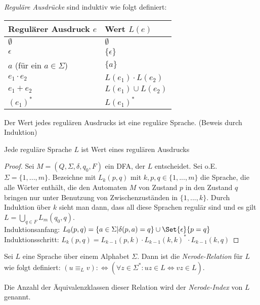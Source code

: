 \documentclass{cheat-sheet}
\begin{document}
\begin{defn}
\emph{Reguläre Ausdrücke} sind induktiv wie folgt definiert:

\begin{center}
\begin{tabular}{ l | l }
  Regulärer Ausdruck $e$ & Wert $L(e)$ \\
  \hline
  $\emptyset$ & $\emptyset$ \\
  $\epsilon$ & $\{\epsilon\}$ \\
  $a$ (für ein $a \in \Sigma$) & $\{ a \}$ \\
  $e_{1} \cdot e_{2}$ & $L(e_{1}) \cdot L(e_{2})$ \\
  $e_{1} + e_{2}$ & $L(e_{1}) \cup L(e_{2})$ \\
  $(e_{1})^{*}$ & $L(e_{1})^{*}$ \\
\end{tabular}
\end{center}

\end{defn}

\begin{satz}
Der Wert jedes regulären Ausdrucks ist eine reguläre Sprache. (Beweis durch Induktion)
\end{satz}

\begin{satz}
Jede reguläre Sprache $L$ ist Wert eines regulären Ausdrucks
\end{satz}

\begin{proof}
Sei $M = (Q, \Sigma, \delta, q_{0}, F)$ ein DFA, der $L$ entscheidet. Sei o.E. $\Sigma = \{ 1, ..., m \}$. Bezeichne mit $L_{k}(p, q)$ mit $k, p, q \in \{1, ..., m\}$ die Sprache, die alle Wörter enthält, die den Automaten $M$ von Zustand $p$ in den Zustand $q$ bringen nur unter Benutzung von Zwischenzuständen in $\{ 1, ..., k \}$. Durch Induktion über $k$ sieht man dann, dass all diese Sprachen regulär sind und es gilt $L = \bigcup_{q \in F} L_{m}(q_{0}, q)$.\\
Induktionsanfang: $L_{0}(p, q) = \{ a \in \Sigma | \delta(p, a) = q \} \cup \Set{\epsilon}{p = q}$ \\
Induktionsschritt: $L_{k}(p, q) = L_{k-1}(p, k) \cdot L_{k-1}(k, k)^{*} \cdot L_{k-1}(k, q)$
\end{proof}

\begin{defn}
Sei $L$ eine Sprache über einem Alphabet $\Sigma$. Dann ist die \emph{Nerode-Relation} für $L$ wie folgt definiert: $(u \equiv_{L} v) :\Leftrightarrow (\forall z \in \Sigma^{*}: uz \in L \Leftrightarrow vz \in L)$.

Die Anzahl der Äquivalenzklassen dieser Relation wird der \emph{Nerode-Index} von $L$ genannt.
\end{defn}
\end{document}
